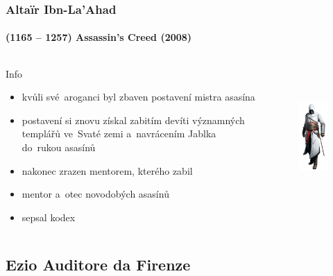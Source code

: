 \documentclass[hyperref={colorlinks, linkcolor=white, urlcolor=green!50!black}]{beamer}
\begin{document}
\begin{frame}\label{altair}
\frametitle{Altaïr Ibn-La'Ahad}
\framesubtitle{(1165 -- 1257) \hfill Assassin's Creed (2008)}
\begin{columns}[c]
	
	\begin{block}{Info}
	\begin{itemize}
		\item kvůli své~aroganci byl zbaven postavení mistra asasína
		\item postavení si znovu získal zabitím devíti významných templářů ve~Svaté zemi a~navrácením Jablka do~rukou asasínů
		\item nakonec zrazen mentorem, kterého zabil
		\item mentor a~otec novodobých asasínů
		\item sepsal kodex
	\end{itemize}
	\end{block}
	
	\begin{figure}[h]
		\centering
		\includegraphics[height=200px]{char_altair}
	\end{figure}
	
\end{columns}
\end{frame}

\subsection[Ezio]{Ezio Auditore da Firenze}
\end{document}
